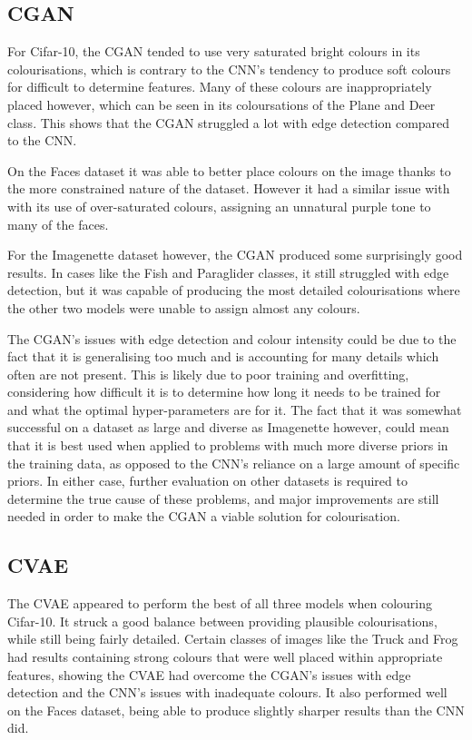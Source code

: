 \documentclass{l4proj}
\begin{document}
\subsection{CGAN}

For Cifar-10, the CGAN tended to use very saturated bright colours in its colourisations, which is contrary to the CNN's tendency to produce soft colours for difficult to determine features. Many of these colours are inappropriately placed however, which can be seen in its coloursations of the Plane and Deer class. This shows that the CGAN struggled a lot with edge detection compared to the CNN. 

On the Faces dataset it was able to better place colours on the image thanks to the more constrained nature of the dataset. However it had a similar issue with with its use of over-saturated colours, assigning an unnatural purple tone to many of the faces.

For the Imagenette dataset however, the CGAN produced some surprisingly good results. In cases like the Fish and Paraglider classes, it still struggled with edge detection, but it was capable of producing the most detailed colourisations where the other two models were unable to assign almost any colours. 

The CGAN's issues with edge detection and colour intensity could be due to the fact that it is generalising too much and is accounting for many details which often are not present. This is likely due to poor training and overfitting, considering how difficult it is to determine how long it needs to be trained for and what the optimal hyper-parameters are for it. The fact that it was somewhat successful on a dataset as large and diverse as Imagenette however, could mean that it is best used when applied to problems with much more diverse priors in the training data, as opposed to the CNN's reliance on a large amount of specific priors. In either case, further evaluation on other datasets is required to determine the true cause of these problems, and major improvements are still needed in order to make the CGAN a viable solution for colourisation.

\subsection{CVAE}
\label{cvaediscussion}

The CVAE appeared to perform the best of all three models when colouring Cifar-10. It struck a good balance between providing plausible colourisations, while still being fairly detailed. Certain classes of images like the Truck and Frog had results containing strong colours that were well placed within appropriate features, showing the CVAE had overcome the CGAN's issues with edge detection and the CNN's issues with inadequate colours. It also performed well on the Faces dataset, being able to produce slightly sharper results than the CNN did.
\end{document}
